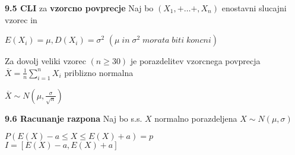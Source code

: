 \documentclass{article}
\begin{document}
\begin{multicols}{2}
\textbf{9.5 CLI} za \textbf{vzorcno povprecje}
Naj bo  $(X_1, + \dots +, X_n)$ enostavni slucajni vzorec in
\begin{center}
    \begin{math}
        E(X_i) = \mu, D(X_i) = \sigma^2
    \end{math}
    \begin{math}
        (\mu\; in\; \sigma^2\; morata\; biti\; koncni)
    \end{math}
\end{center}
Za dovolj veliki vzorec $(n \geq 30)$ je porazdelitev vzorcnega povprecja
$\overline{X} = \frac{1}{n} \sum_{i = 1}^{n} X_i$ priblizno normalna
\begin{center}
    \begin{math}
        \overline{X} \sim N(\mu, \frac{\sigma}{\sqrt{n}})
    \end{math}
\end{center}

\textbf{9.6 Racunanje razpona}
Naj bo s.s. $X$ normalno porazdeljena $X \sim N(\mu, \sigma)$
\begin{center}
    \begin{math}
        P(E(X) - a \leq X \leq E(X) + a) = p
    \end{math}\\
    \begin{math}
        I = [E(X) -a, E(X) + a]
    \end{math}
\end{center}

\bigskip
\end{multicols}
\end{document}
